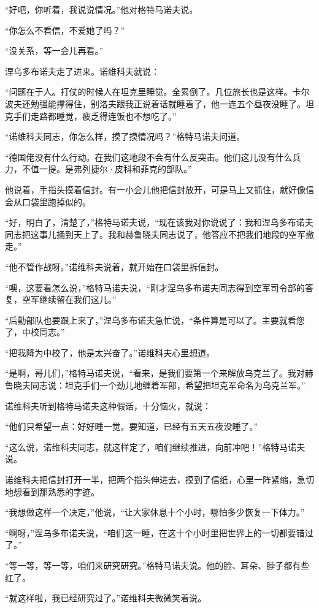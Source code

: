 “好吧，你听着，我说说情况。”他对格特马诺夫说。

“你怎么不看信，不爱她了吗？”

“没关系，等一会儿再看。”

涅乌多布诺夫走了进来。诺维科夫就说：

“问题在于人。打仗的时候人在坦克里睡觉。全累倒了。几位旅长也是这样。卡尔波夫还勉强能撑得住，别洛夫跟我正说着话就睡着了，他一连五个昼夜没睡了。坦克手们走路都睡觉，疲乏得连饭也不想吃了。”

“诺维科夫同志，你怎么样，摸了摸情况吗？”格特马诺夫问道。

“德国佬没有什么行动。在我们这地段不会有什么反突击。他们这儿没有什么兵力，不值一提。是弗列捷尔·皮科和菲克的部队。”

他说着，手指头摸着信封。有一小会儿他把信封放开，可是马上又抓住，就好像信会从口袋里跑掉似的。

“好，明白了，清楚了，”格特马诺夫说，“现在该我对你说说了：我和涅乌多布诺夫同志把这事儿捅到天上了。我和赫鲁晓夫同志说了，他答应不把我们地段的空军撤走。”

“他不管作战呀。”诺维科夫说着，就开始在口袋里拆信封。

“噢，这要看怎么说，”格特马诺夫说，“刚才涅乌多布诺夫同志得到空军司令部的答复，空军继续留在我们这儿。”

“后勤部队也要跟上来了，”涅乌多布诺夫急忙说，“条件算是可以了。主要就看您了，中校同志。”

“把我降为中校了，他是太兴奋了。”诺维科夫心里想道。

“是啊，哥儿们，”格特马诺夫说，“看来，是我们要第一个来解放乌克兰了。我对赫鲁晓夫同志说：坦克手们一个劲儿地缠着军部，希望把坦克军命名为乌克兰军。”

诺维科夫听到格特马诺夫这种假话，十分恼火，就说：

“他们只希望一点：好好睡一觉。要知道，已经有五天五夜没睡了。”

“这么说，诺维科夫同志，就这样定了，咱们继续推进，向前冲吧！”格特马诺夫说。

诺维科夫把信封打开一半，把两个指头伸进去，摸到了信纸，心里一阵紧缩，急切地想看到那熟悉的字迹。

“我想做这样一个决定，”他说，“让大家休息十个小时，哪怕多少恢复一下体力。”

“啊呀，”涅乌多布诺夫说，“咱们这一睡，在这十个小时里把世界上的一切都要错过了。”

“等一等，等一等，咱们来研究研究。”格特马诺夫说。他的脸、耳朵、脖子都有些红了。

“就这样啦，我已经研究过了。”诺维科夫微微笑着说。

